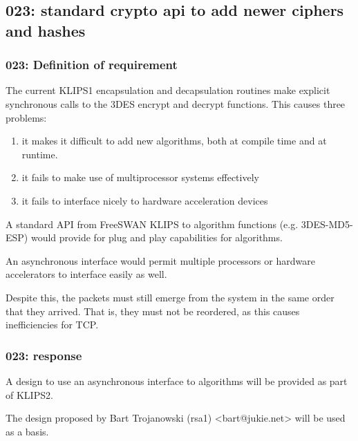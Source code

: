 \subsection{023: standard crypto api to add newer ciphers and hashes}

\subsubsection{023: Definition of requirement }

The current KLIPS1 encapsulation and decapsulation routines make explicit
synchronous calls to the 3DES encrypt and decrypt functions. This causes
three problems:
\begin{enumerate}
\item it makes it difficult to add new algorithms, both at compile time and
	at runtime.
\item it fails to make use of multiprocessor systems effectively
\item it fails to interface nicely to hardware acceleration devices
\end{enumerate}

A standard API from FreeSWAN KLIPS to algorithm functions (e.g. 3DES-MD5-ESP)
would provide for plug and play capabilities for algorithms.

An asynchronous interface would permit multiple processors or hardware
accelerators to interface easily as well.

Despite this, the packets must still emerge from the system in the same order 
that they arrived. That is, they must not be reordered, as this causes
inefficiencies for TCP.

\subsubsection{023: response}

A design to use an asynchronous interface to algorithms will be provided as
part of KLIPS2.

The design proposed by Bart Trojanowski (rsa1) <bart@jukie.net> will be used
as a basis.

